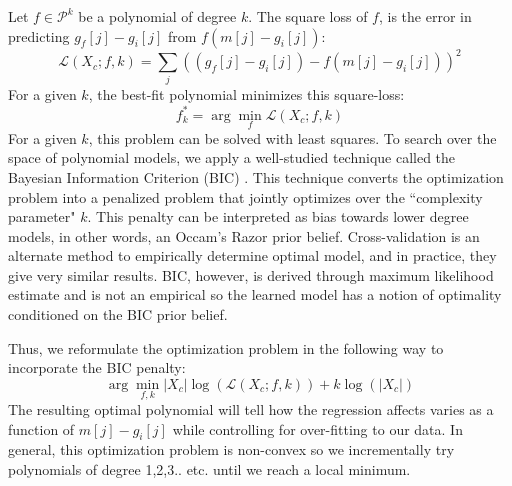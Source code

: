 Let $f\in \mathcal{P}^k$ be a polynomial of degree $k$.
The square loss of $f$, is the error in predicting $g_f[j] - g_i[j]$ from $f(m[j] - g_i[j])$:
\begin{equation}
\mathcal{L}(X_c;f,k) = \sum_j ((g_f[j] - g_i[j]) - f(m[j] - g_i[j]))^2 
\end{equation}
For a given $k$, the best-fit polynomial minimizes this square-loss:
\begin{equation}
f^*_k =\arg \min_f \mathcal{L}(X_c;f,k)
\end{equation}
For a given $k$, this problem can be solved with least squares.
To search over the space of polynomial models, we apply a well-studied technique called the Bayesian Information Criterion (BIC) \cite{schwarz1978estimating,burnham2002model}.
This technique converts the optimization problem into a penalized problem that jointly optimizes over the ``complexity parameter" $k$.
This penalty can be interpreted as bias towards lower degree models, in other words, an Occam's Razor prior belief. 
Cross-validation is an alternate method to empirically determine optimal model, and in practice, they give very similar results.
BIC, however, is derived through maximum likelihood estimate and is not an empirical so the learned model has a notion of optimality conditioned on the BIC prior belief.

Thus, we reformulate the optimization problem in the following way to incorporate the BIC penalty:
\begin{equation}
\arg \min_{f,k} |X_c|\log(\mathcal{L}(X_c;f,k)) + k\log(|X_c|)
\end{equation}
The resulting optimal polynomial will tell how the regression affects varies as a function of $m[j] - g_i[j]$ while controlling for over-fitting to our data.
In general, this optimization problem is non-convex so we incrementally try polynomials of degree 1,2,3.. etc. until we reach a local minimum.
